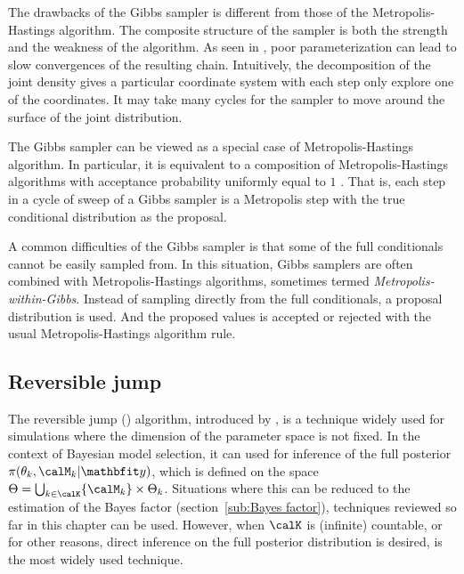 The drawbacks of the Gibbs sampler is different from those of the
Metropolis-Hastings algorithm. The composite structure of the sampler is both
the strength and the weakness of the algorithm. As seen in
\cite{Hills:1993vb}, poor parameterization can lead to slow convergences of
the resulting chain. Intuitively, the decomposition of the joint density gives
a particular coordinate system with each step only explore one of the
coordinates. It may take many cycles for the sampler to move around the
surface of the joint distribution.

The Gibbs sampler can be viewed as a special case of Metropolis-Hastings
algorithm. In particular, it is equivalent to a composition of
Metropolis-Hastings algorithms with acceptance probability uniformly equal to
$1$ \cite[][Theorem~10.13]{Robert:2004tn}. That is, each step in a cycle of
sweep of a Gibbs sampler is a Metropolis step with the true conditional
distribution as the proposal.

A common difficulties of the Gibbs sampler is that some of the full
conditionals cannot be easily sampled from. In this situation, Gibbs samplers
are often combined with Metropolis-Hastings algorithms, sometimes termed
\emph{Metropolis-within-Gibbs}. Instead of sampling directly from the full
conditionals, a proposal distribution is used. And the proposed values is
accepted or rejected with the usual Metropolis-Hastings algorithm rule.

\subsection{Reversible jump \protect\mcmc}
\label{sub:Reversible jump mcmc}

The reversible jump \mcmc (\rjmcmc) algorithm, introduced by
\cite{Green:1995dg}, is a technique widely used for simulations where the
dimension of the parameter space is not fixed. In the context of Bayesian
model selection, it can used for inference of the full posterior
$\pi(\theta_k,\calM_k|\data)$, which is defined on the space $\Theta =
\bigcup_{k\in\calK}\{\calM_k\}\times\Theta_k$. Situations where this can be
reduced to the estimation of the Bayes factor (section~\ref{sub:Bayes
  factor}), techniques reviewed so far in this chapter can be used. However,
when $\calK$ is (infinite) countable, or for other reasons, direct inference
on the full posterior distribution is desired, \rjmcmc is the most widely used
technique.

